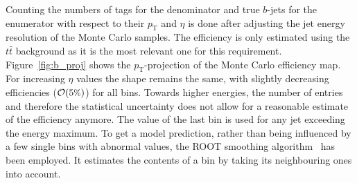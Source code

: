 Counting the numbers of tags for the denominator and true $b$-jets for the enumerator with respect to their $p_{\text{T}}$ and $\eta$ is done after adjusting the jet energy resolution of the Monte Carlo samples. The efficiency is only estimated using the $t\bar{t}$ background as it is the most relevant one for this requirement. Figure~\ref{fig:b_proj} shows the $p_{\text{T}}$-projection of the Monte Carlo efficiency map. For increasing $\eta$ values the shape remains the same, with slightly decreasing efficiencies ($\mathcal{O}(5\pct)$) for all bins. Towards higher energies, the number of entries and therefore the statistical uncertainty does not allow for a reasonable estimate of the efficiency anymore. The value of the last bin is used for any jet exceeding the energy maximum. To get a model prediction, rather than being influenced by a few single bins with abnormal values, the \textsc{ROOT} smoothing algorithm~\cite{rootsmooth} has been employed. It estimates the contents of a bin by taking its neighbouring ones into account.

